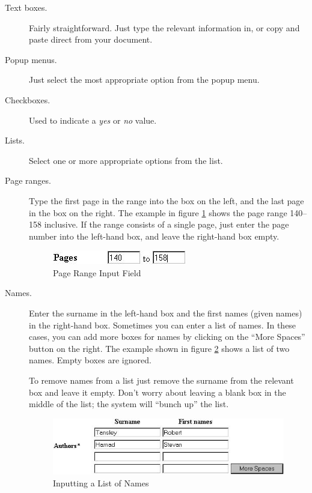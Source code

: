 \begin{description}

\item[Text boxes.] Fairly straightforward. Just type the relevant information in, or copy and paste direct from your document.

\item[Popup menus.] Just select the most appropriate option from the popup menu.

\item[Checkboxes.] Used to indicate a \emph{yes} or \emph{no} value.

\item[Lists.] Select one or more appropriate options from the list.

\item[Page ranges.] Type the first page in the range into the box on the left, and the last page in the box on the right. The example in figure \ref{pagerange} shows the page range 140--158 inclusive. If the range consists of a single page, just enter the page number into the left-hand box, and leave the right-hand box empty.

\begin{figure}
\centerline{\includegraphics[width=2.3in]{images/pagerange}}
\caption{\label{pagerange} Page Range Input Field}
\end{figure}

\item[Names.] Enter the surname in the left-hand box and the first names (given names) in the right-hand box. Sometimes you can enter a list of names. In these cases, you can add more boxes for names by clicking on the ``More Spaces'' button on the right. The example shown in figure \ref{names} shows a list of two names. Empty boxes are ignored.

To remove names from a list just remove the surname from the relevant box and leave it empty. Don't worry about leaving a blank box in the middle of the list; the system will ``bunch up'' the list.

\begin{figure}
\centerline{\includegraphics[width=4.8in]{images/names}}
\caption{\label{names} Inputting a List of Names}
\end{figure}

\end{description}

